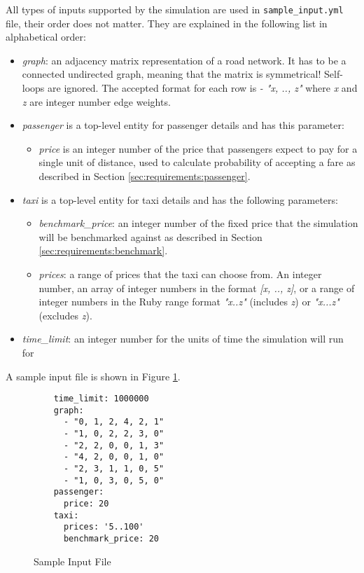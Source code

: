 
All types of inputs supported by the simulation are used in
\texttt{sample\_input.yml} file, their order does not matter. They are explained
in the following list in alphabetical order:

\begin{itemize}
  \item \textit{graph}: an adjacency matrix representation of a road network.
        It has to be a connected undirected graph, meaning that the matrix is
        symmetrical! Self-loops are ignored. The accepted format for each row
        is \textit{- "x, .., z"} where \textit{x} and \textit{z} are integer
        number edge weights.
  \item \textit{passenger} is a top-level entity for passenger details and has
        this parameter:
        \begin{itemize} 
          \item \textit{price} is an integer number of the price that
                passengers expect to pay for a single unit of distance, used to
                calculate probability of accepting a fare as described in
                Section \ref{sec:requirements:passenger}.
        \end{itemize}
  \item \textit{taxi} is a top-level entity for taxi details and has the
        following parameters:
        \begin{itemize}
          \item \textit{benchmark\_price}: an integer number of the fixed price
          that the simulation will be benchmarked against as described in
          Section \ref{sec:requirements:benchmark}.
          \item \textit{prices}: a range of prices that the taxi can choose
          from. An integer number, an array of integer numbers in the format 
          \textit{[x, .., z]}, or a range of integer numbers in the Ruby range
          format \textit{"x..z"} (includes \textit{z}) or \textit{"x...z"}
          (excludes \textit{z}).
        \end{itemize}
  \item \textit{time\_limit}: an integer number for the units of time the
        simulation will run for
\end{itemize}

A sample input file is shown in Figure \ref{figure:input}.


\begin{figure}
  \begin{verbatim}
    time_limit: 1000000
    graph:
      - "0, 1, 2, 4, 2, 1"
      - "1, 0, 2, 2, 3, 0"
      - "2, 2, 0, 0, 1, 3"
      - "4, 2, 0, 0, 1, 0"
      - "2, 3, 1, 1, 0, 5"
      - "1, 0, 3, 0, 5, 0"
    passenger:
      price: 20
    taxi:
      prices: '5..100'
      benchmark_price: 20
  \end{verbatim}
\caption{
  Sample Input File
  \label{figure:input}
}
\end{figure}


